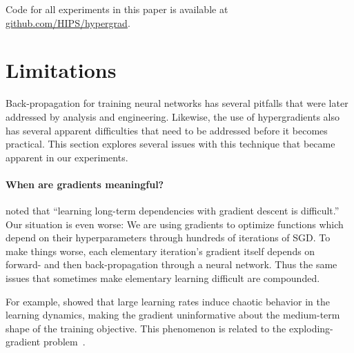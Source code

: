 \documentclass{article}
\newcommand{\primal}{elementary}
\begin{document}
Code for all experiments in this paper is available at \url{github.com/HIPS/hypergrad}.


\section{Limitations}

Back-propagation for training neural networks has several pitfalls that were later addressed by analysis and engineering.
Likewise, the use of hypergradients also has several apparent difficulties that need to be addressed before it becomes practical.
This section explores several issues with this technique that became apparent in our experiments.

\paragraph{When are gradients meaningful?}
\citet{bengio1994learning} noted that ``learning long-term dependencies with gradient descent is difficult.''
Our situation is even worse: We are using gradients to optimize functions which depend on their hyperparameters through hundreds of iterations of SGD.
To make things worse, each \primal{} iteration's gradient itself depends on forward- and then back-propagation through a neural network.
Thus the same issues that sometimes make \primal{} learning difficult are compounded.


For example, \citet*[Chapter 4]{pearlmutter1996investigation} showed that 
large learning rates induce chaotic behavior in the learning dynamics,
making the gradient uninformative about the medium-term shape of the training objective.
This phenomenon is related to the exploding-gradient problem~\cite{pascanu2012understanding}.
\end{document}

